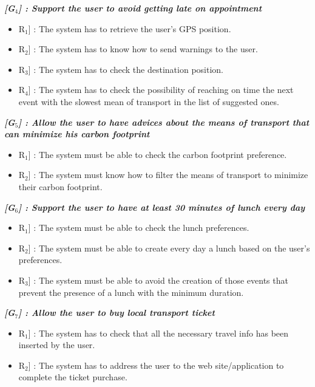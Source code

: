 \vspace{0.5cm}
\noindent
\emph{\textbf{[G$_{4}$] : Support the user to avoid getting late on appointment}}
\begin{itemize}
	\setlength{\leftskip}{0.5cm}
	\item \lbrack R$_{1}$] : The system has to retrieve the user's GPS position.
	\item \lbrack R$_{2}$] : The system has to know how to send warnings to the user.
	\item \lbrack R$_{3}$] : The system has to check the destination position.
	\item \lbrack R$_{4}$] : The system has to check the possibility of reaching on time the next event with the slowest mean of transport in the list of suggested ones.
\end{itemize}

\vspace{0.5cm}
\noindent
\emph{\textbf{[G$_{5}$] : Allow the user to have advices about the means of transport that can minimize his carbon footprint}}
\begin{itemize}
	\setlength{\leftskip}{0.5cm}
	\item \lbrack R$_{1}$] : The system must be able to check the carbon footprint preference.
	\item \lbrack R$_{2}$] : The system must know how to filter the means of transport to minimize their carbon footprint.
\end{itemize}

\vspace{0.5cm}
\noindent
\emph{\textbf{[G$_{6}$] : Support the user to have at least 30 minutes of lunch every day}}
\begin{itemize}
	\setlength{\leftskip}{0.5cm}
	\item \lbrack R$_{1}$] : The system must be able to check the lunch preferences.
	\item \lbrack R$_{2}$] : The system must be able to create every day a lunch based on the user's preferences.
	\item \lbrack R$_{3}$] : The system must be able to avoid the creation of those events that prevent the presence of a lunch with the minimum duration.
\end{itemize}

\newpage
\noindent
\emph{\textbf{[G$_{7}$] : Allow the user to buy local transport ticket}}
\begin{itemize}
	\setlength{\leftskip}{0.5cm}
	\item \lbrack R$_{1}$] : The system has to check that all the necessary travel info has been inserted by the user.
	\item \lbrack R$_{2}$] : The system has to address the user to the web site/application to complete the ticket purchase.
\end{itemize}

